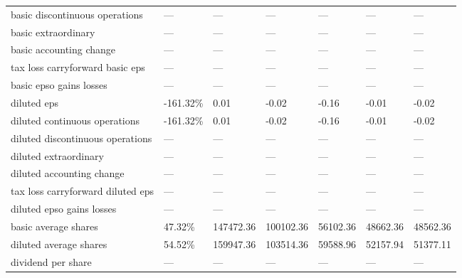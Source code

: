 \begin{table}[]
{\begin{tabular}{@{}lllllll@{}}
basic discontinuous operations                                & —          & —         & —         & —        & —        & —        \\
basic extraordinary                                           & —          & —         & —         & —        & —        & —        \\
basic accounting change                                       & —          & —         & —         & —        & —        & —        \\
tax loss carryforward basic eps                               & —          & —         & —         & —        & —        & —        \\
basic epso gains losses                                       & —          & —         & —         & —        & —        & —        \\
diluted eps                                                   & -161.32\%  & 0.01      & -0.02     & -0.16    & -0.01    & -0.02    \\
diluted continuous operations                                 & -161.32\%  & 0.01      & -0.02     & -0.16    & -0.01    & -0.02    \\
diluted discontinuous operations                              & —          & —         & —         & —        & —        & —        \\
diluted extraordinary                                         & —          & —         & —         & —        & —        & —        \\
diluted accounting change                                     & —          & —         & —         & —        & —        & —        \\
tax loss carryforward diluted eps                             & —          & —         & —         & —        & —        & —        \\
diluted epso gains losses                                     & —          & —         & —         & —        & —        & —        \\
basic average shares                                          & 47.32\%    & 147472.36 & 100102.36 & 56102.36 & 48662.36 & 48562.36 \\
diluted average shares                                        & 54.52\%    & 159947.36 & 103514.36 & 59588.96 & 52157.94 & 51377.11 \\
dividend per share                                            & —          & —         & —         & —        & —        & —        \\

\end{tabular}}
\end{table}
